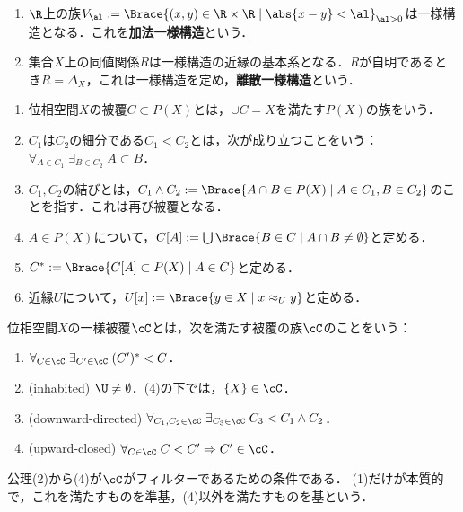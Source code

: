 \documentclass[uplatex,dvipdfmx]{jsreport}
\begin{document}
\begin{example}[加法構造]\mbox{}
    \begin{enumerate}
        \item $\R$上の族$V_\al:=\Brace{(x,y)\in\R\times\R\mid\abs{x-y}<\al}_{\al>0}$は一様構造となる．これを\textbf{加法一様構造}という．
        \item 集合$X$上の同値関係$R$は一様構造の近縁の基本系となる．$R$が自明であるとき$R=\Delta_X$，これは一様構造を定め，\textbf{離散一様構造}という．
    \end{enumerate}
\end{example}

\begin{definition}[被覆]\mbox{}
    \begin{enumerate}
        \item 位相空間$X$の被覆$C\subset P(X)$とは，$\cup C=X$を満たす$P(X)$の族をいう．
        \item $C_1$は$C_2$の細分である$C_1<C_2$とは，次が成り立つことをいう：$\forall_{A\in C_1}\;\exists_{B\in C_2}\;A\subset B$．
        \item $C_1,C_2$の結びとは，$C_1\land C_2:=\Brace{A\cap B\in P(X)\mid A\in C_1,B\in C_2}$のことを指す．これは再び被覆となる．
        \item $A\in P(X)$について，$C[A]:=\bigcup\Brace{B\in C\mid A\cap B\ne\emptyset}$と定める．
        \item $C^*:=\Brace{C[A]\subset P(X)\mid A\in C}$と定める．
        \item 近縁$U$について，$U[x]:=\Brace{y\in X\mid x\approx_U y}$と定める．
    \end{enumerate}
\end{definition}

\begin{definition}
    位相空間$X$の一様被覆$\cC$とは，次を満たす被覆の族$\cC$のことをいう：
    \begin{enumerate}
        \item $\forall_{C\in\cC}\;\exists_{C'\in\cC}\;(C')^*<C$．
        \item (inhabited) $\U\ne\emptyset$．(4)の下では，$\{X\}\in\cC$．
        \item (downward-directed) $\forall_{C_1,C_2\in\cC}\;\exists_{C_3\in\cC}\;C_3<C_1\land C_2$．
        \item (upward-closed) $\forall_{C\in\cC}\;C<C'\Rightarrow C'\in\cC$．
    \end{enumerate}
\end{definition}
\begin{remarks}
    公理(2)から(4)が$\cC$がフィルターであるための条件である．
    (1)だけが本質的で，これを満たすものを準基，(4)以外を満たすものを基という．
\end{remarks}
\end{document}
